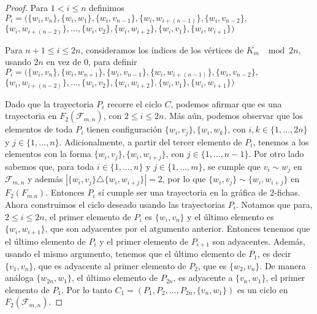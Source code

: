\begin{proof}
    Para $1 < i \leq n$ definimos
    $P_i=(\{w_i,v_n\},\{w_i,w_1\},\{w_i,v_{n-1}\},\{w_i,w_{i+(n-1)}\},\{w_i,v_{n-2}\},$
    $\{w_i,w_{i+(n-2)}\},\dots,\{w_i,v_2\},\{w_i,w_{i+2}\},\{w_i,v_1\},\{w_i,w_{i+1}\})$

    Para $n+1\leq i \leq 2n$, consideramos los \'indices de los v\'ertices de
    $\overline{K_m}$ $\mod 2n$, usando $2n$ en vez de $0$, para definir
    $P_i=(\{w_i,v_n\},\{w_i,w_{n+1}\},\{w_i,v_{n-1}\},\{w_i,w_{i+(n-1)}\},\{w_i,v_{n-2}\},$
    $\{w_i,w_{i+(n-2)}\},\dots,
    \{w_i,v_2\},\{w_i,w_{i+2}\},\{w_i,v_1\},\{w_i,w_{i+1}\})$

    Dado que la trayectoria $P_i$ recorre el ciclo $C$, podemos afirmar que es
    una trayectoria en $F_2(\mathcal{F}_{m,n})$, con $2\leq i \leq 2n$. M\'as a\'un,
    podemos observar que los elementos de toda $P_i$ tienen configuraci\'on
    $\{w_i,v_j\},\{w_i,w_k\}$, con $i, k\in \{1, \dots, 2n\}$ y $j \in \{1,
    \dots, n\}$. Adicionalmente, a partir del tercer elemento de $P_i$, tenemos a
    los elementos con la forma $\{w_i,v_j\},\{w_i,w_{i+j}\}$, con $j \in \{1,
    \dots, n-1\}$.  Por otro lado sabemos que, para toda $i \in \{1, \dots, n\}$
    y $j \in \{1, \dots, m\}$, se cumple que $v_i \sim w_j$ en $\mathcal{F}_{m,n}$ y
    adem\'as $|\{w_i,v_j\} \triangle \{w_i, w_{i+j}\}|=2$, por lo que
    $\{w_i,v_j\} \sim \{w_i, w_{i+j}\}$ en $F_2(F_{m.n})$. Entonces $P_i$ s\'i
    cumple ser una trayectoria en la gr\'afica de $2$-fichas. Ahora construimos
    el ciclo deseado usando las trayectorias $P_i$. Notamos que para, $2 \leq i
    \leq 2n$, el primer elemento de $P_i$ es $\{w_i, v_n\}$ y el \'ultimo
    elemento es $\{w_i, w_{i+1}\}$, que son adyacentes por el atgumento
    anterior. Entonces tenemos que el \'ultimo elemento de $P_i$ y el primer
    elemento de $P_{i+1}$ son adyacentes. Adem\'as, usando el mismo argumento,
    tenemos que el \'ultimo elemento de $P_1$, es decir $\{v_1,v_n\}$, que es
    adyacente al primer elemento de $P_2$, que es $\{w_2,v_n\}$. De manera
    an\'aloga $\{w_{2n},w_1\}$, el \'ultimo elemento de $P_{2n}$, es adyacente a
    $\{v_n,w_1\}$, el primer elemento de $P_1$. Por lo tanto $C_1 = (P_1,P_2,
    \dots, P_{2n},\{v_n,w_1\})$ es un ciclo en $F_2(\mathcal{F}_{m,n})$. 


\end{proof}
